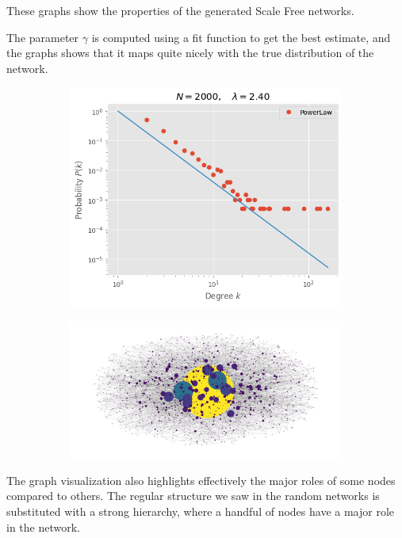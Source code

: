 \documentclass[
]{article}
\begin{document}
These graphs show the properties of the generated Scale Free networks.

The parameter \(\gamma\) is computed using a fit function to get the
best estimate, and the graphs shows that it maps quite nicely with the
true distribution of the network.

\begin{figure}
  \begin{subfigure}{0.4\textwidth}
    \includegraphics{./assets/2000_lambda_est.png}
  \end{subfigure}
  \hfill
  \begin{subfigure}{0.4\textwidth}
    \includegraphics{assets/scalefree_draw.png}
  \end{subfigure}
\end{figure}

The graph visualization also highlights effectively the major roles of
some nodes compared to others. The regular structure we saw in the
random networks is substituted with a strong hierarchy, where a handful
of nodes have a major role in the network.
\end{document}
